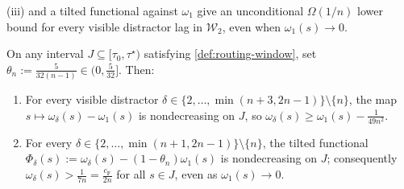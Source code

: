 (iii) and a tilted functional against $\omega_1$ give an unconditional $\Omega(1/n)$ lower bound for every visible distractor lag in $\mathcal W_2$, even when $\omega_1(s) \to 0$.

\begin{lemma}
\label{lem:U-floor-vis}
On any interval $J \subseteq [\tau_0, \tau^\star)$ satisfying \cref{def:routing-window}, set $\theta_n := \frac{5}{32(n-1)} \in (0, \frac{5}{32}]$. Then:
\begin{enumerate}[label=(\roman*),leftmargin=*]
\item For every visible distractor $\delta \in \{2,\ldots,\min(n+3, 2n-1)\}\setminus\{n\}$, the map $s \mapsto \omega_\delta(s) - \omega_1(s)$ is nondecreasing on $J$, so $\omega_\delta(s) \ge \omega_1(s) - \frac{1}{49n^2}$.
\item For every $\delta \in \{2,\ldots,\min(n+1, 2n-1)\}\setminus\{n\}$, the tilted functional $\Phi_\delta(s) := \omega_\delta(s) - (1-\theta_n)\omega_1(s)$ is nondecreasing on $J$; consequently $\omega_\delta(s) > \frac{1}{7n} = \frac{c_{\mathrm F}}{2n}$ for all $s \in J$, even as $\omega_1(s) \to 0$.
\end{enumerate}
\end{lemma}

